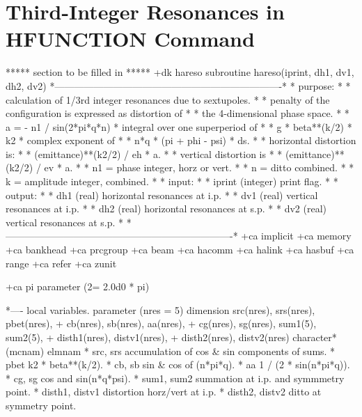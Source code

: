  
\section{Third-Integer Resonances in HFUNCTION Command}
***** section to be filled in *****
\iffalse
+dk hareso
      subroutine hareso(iprint, dh1, dv1, dh2, dv2)
*----------------------------------------------------------------------*
* purpose:                                                             *
*   calculation of 1/3rd integer resonances due to sextupoles.         *
*   penalty of the configuration is expressed as distortion of         *
*   the 4-dimensional phase space.                                     *
*   a = - n1 / sin(2*pi*q*n) * integral over one superperiod of        *
*       g * beta**(k/2) * k2 * complex exponent of                     *
*       n*q * (pi + phi - psi) * ds.                                   *
*   horizontal distortion is:                                          *
*   (emittance)**(k2/2) / eh * a.                                      *
*   vertical distortion is                                             *
*   (emittance)**(k2/2) / ev * a.                                      *
*     n1 = phase integer, horz or vert.                                *
*     n  = ditto          combined.                                    *
*     k  = amplitude integer, combined.                                *
* input:                                                               *
*   iprint    (integer) print flag.                                    *
* output:                                                              *
*   dh1       (real)    horizontal resonances at i.p.                  *
*   dv1       (real)    vertical resonances   at i.p.                  *
*   dh2       (real)    horizontal resonances at s.p.                  *
*   dv2       (real)    vertical resonances   at s.p.                  *
*----------------------------------------------------------------------*
+ca implicit
+ca memory
+ca bankhead
+ca prcgroup
+ca beam
+ca hacomm
+ca halink
+ca hasbuf
+ca range
+ca refer
+ca zunit
 
+ca pi
      parameter         (2\pi = 2.0d0 * pi)
 
*---- local variables.
      parameter         (nres = 5)
      dimension         src(nres), srs(nres), pbet(nres),
     +                  cb(nres), sb(nres), aa(nres),
     +                  cg(nres), sg(nres), sum1(5), sum2(5),
     +                  disth1(nres), distv1(nres),
     +                  disth2(nres), distv2(nres)
      character*(mcnam) elmnam
*     src, srs          accumulation of cos & sin components of sums.
*     pbet              k2 * beta**(k/2).
*     cb, sb            sin & cos of (n*pi*q).
*     aa                1 / (2 * sin(n*pi*q)).
*     cg, sg            cos and sin(n*q*psi).
*     sum1, sum2        summation at i.p. and symmmetry point.
*     disth1, distv1    distortion horz/vert at i.p.
*     disth2, distv2    ditto at symmetry point.
 
